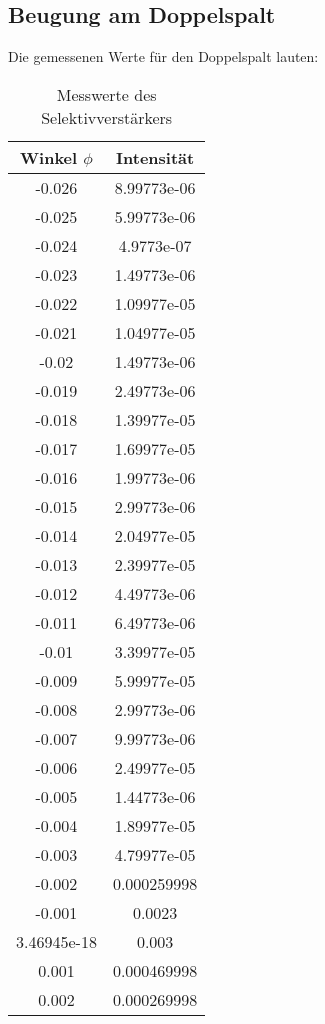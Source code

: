 \subsection{Beugung am Doppelspalt}
  Die gemessenen Werte für den Doppelspalt lauten:
  \begin{table}[H]
    \centering
    \caption{Messwerte des Selektivverstärkers}
    \label{tab:mag}
    \begin{tabular}{c c}
     \toprule
      Winkel $\phi$ & Intensität\\
     \midrule
  -0.026       & 8.99773e-06 \\
 -0.025       & 5.99773e-06 \\
 -0.024       & 4.9773e-07  \\
 -0.023       & 1.49773e-06 \\
 -0.022       & 1.09977e-05 \\
 -0.021       & 1.04977e-05 \\
 -0.02        & 1.49773e-06 \\
 -0.019       & 2.49773e-06 \\
 -0.018       & 1.39977e-05 \\
 -0.017       & 1.69977e-05 \\
 -0.016       & 1.99773e-06 \\
 -0.015       & 2.99773e-06 \\
 -0.014       & 2.04977e-05 \\
 -0.013       & 2.39977e-05 \\
 -0.012       & 4.49773e-06 \\
 -0.011       & 6.49773e-06 \\
 -0.01        & 3.39977e-05 \\
 -0.009       & 5.99977e-05 \\
 -0.008       & 2.99773e-06 \\
 -0.007       & 9.99773e-06 \\
 -0.006       & 2.49977e-05 \\
 -0.005       & 1.44773e-06 \\
 -0.004       & 1.89977e-05 \\
 -0.003       & 4.79977e-05 \\
 -0.002       & 0.000259998 \\
 -0.001       & 0.0023      \\
  3.46945e-18 & 0.003       \\
  0.001       & 0.000469998 \\
  0.002       & 0.000269998 \\

\end{tabular}
\end{table}
